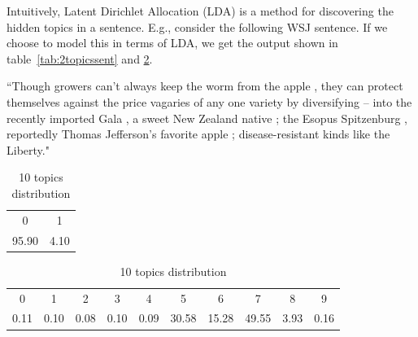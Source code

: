 Intuitively, Latent Dirichlet Allocation (LDA) is a method for discovering the hidden topics in a sentence. E.g., consider the following WSJ sentence. If we choose to model this in terms of LDA, we get the output shown in table~\ref{tab:2topicssent} and \ref{tab:10topicssent}.


``Though growers can't always keep the worm from the apple , they can protect themselves against the price vagaries of any one variety by diversifying -- into the recently imported Gala , a sweet New Zealand native ; the Esopus Spitzenburg , reportedly Thomas Jefferson's favorite apple ; disease-resistant kinds like the Liberty."
 
\begin{table}[!htb]
\centering

\caption{2 topics distribution}
\begin{tabular}{cc}
\\ \hline
0 & 1 \\
95.90 & 4.10 \\ \hline
\end{tabular}
\label{tab:2topicssent}

\caption{10 topics distribution
}
\begin{tabular}{cccccccccc}
\\ \hline

0 & \multicolumn{1}{c}{1} & \multicolumn{1}{c}{2} & \multicolumn{1}{c}{3} & \multicolumn{1}{c}{4} & \multicolumn{1}{c}{5} & \multicolumn{1}{c}{6} & \multicolumn{1}{c}{7} & \multicolumn{1}{c}{8} & \multicolumn{1}{c}{9} \\
0.11 & 0.10 & 0.08 & 0.10 & 0.09 & 30.58 & 15.28 & 49.55 & 3.93 & 0.16 \\ \hline
\end{tabular}
\label{tab:10topicssent}

\end{table}

